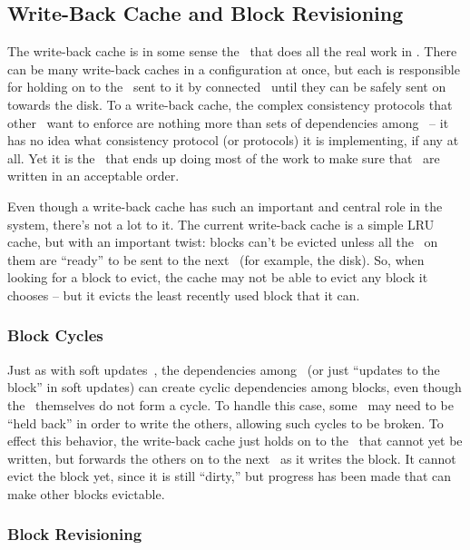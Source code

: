 \subsection{Write-Back Cache and Block Revisioning}
\label{sec:modules:wbcache}

The write-back cache is in some sense the \module\ that does all the real work
in \Kudos. There can be many write-back caches in a configuration at once, but
each is responsible for holding on to the \chdescs\ sent to it by connected
\modules\ until they can be safely sent on towards the disk. To a write-back
cache, the complex consistency protocols that other \modules\ want to enforce
are nothing more than sets of dependencies among \chdescs\ -- it has no idea
what consistency protocol (or protocols) it is implementing, if any at all. Yet
it is the \module\ that ends up doing most of the work to make sure that
\chdescs\ are written in an acceptable order.

Even though a write-back cache has such an important and central role in the
system, there's not a lot to it. The current write-back cache is a simple LRU
cache, but with an important twist: blocks can't be evicted unless all the
\chdescs\ on them are ``ready'' to be sent to the next \module\ (for example,
the disk). So, when looking for a block to evict, the cache may not be able to
evict any block it chooses -- but it evicts the least recently used block that
it can.

\subsubsection{Block Cycles}
\label{sec:modules:wbcache:cycles}

Just as with soft updates~\cite{ganger00soft}, the dependencies among \chdescs\
(or just ``updates to the block'' in soft updates) can create cyclic
dependencies among blocks, even though the \chdescs\ themselves do not form a
cycle. To handle this case, some \chdescs\ may need to be ``held back'' in order
to write the others, allowing such cycles to be broken. To effect this behavior,
the write-back cache just holds on to the \chdescs\ that cannot yet be written,
but forwards the others on to the next \module\ as it writes the block. It
cannot evict the block yet, since it is still ``dirty,'' but progress has been
made that can make other blocks evictable.

\subsubsection{Block Revisioning}

